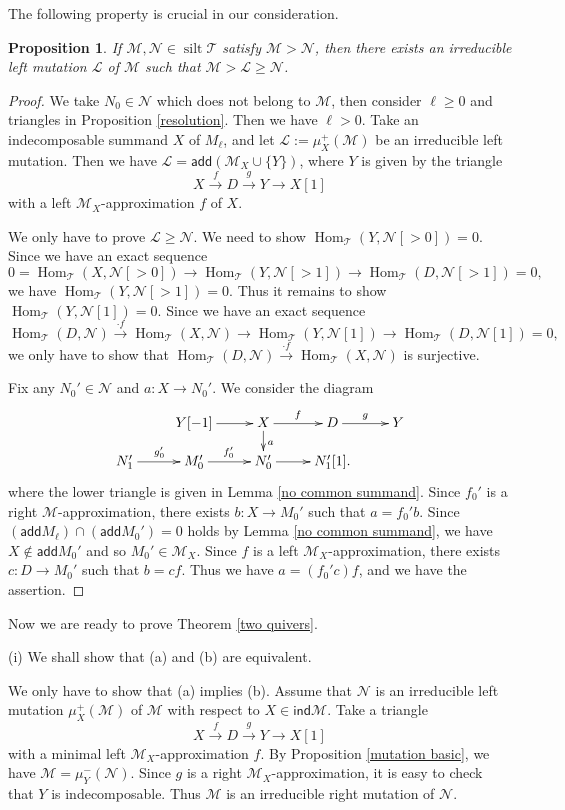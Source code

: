 \documentclass[a4paper,reqno]{amsart}
\newtheorem{proposition}[theorem]{Proposition}
\theoremstyle{definition}
\newcommand{\TT}{{\mathcal T}}
\newcommand{\MM}{{\mathcal M}}
\newcommand{\NN}{{\mathcal N}}
\newcommand{\LL}{{\mathcal L}}
\newcommand{\ind}{\mathsf{ind}}
\newcommand{\add}{\mathsf{add}}
\newcommand{\Hom}{\operatorname{Hom}\nolimits}
\newcommand{\silt}{\operatorname{silt}\nolimits}
\begin{document}
The following property is crucial in our consideration.

\begin{proposition}\label{make closer}
If $\MM,\NN\in\silt\TT$ satisfy $\MM>\NN$,
then there exists an irreducible left mutation $\LL$ of $\MM$ such that $\MM>\LL\ge\NN$.
\end{proposition}

\begin{proof}
We take $N_0\in\NN$ which does not belong to $\MM$,
then consider $\ell\ge0$ and triangles in Proposition \ref{resolution}.
Then we have $\ell>0$. Take an indecomposable summand $X$ of $M_\ell$,
and let $\LL:=\mu_X^+(\MM)$ be an irreducible left mutation.
Then we have $\LL=\add(\MM_X\cup\{Y\})$, where $Y$ is given by the triangle
\[X\xrightarrow{f}D\xrightarrow{g}Y\to X[1]\]
with a left $\MM_X$-approximation $f$ of $X$.

We only have to prove $\LL\ge\NN$. We need to show $\Hom_{\TT}(Y,\NN[>0])=0$.
Since we have an exact sequence
\[0=\Hom_{\TT}(X,\NN[>0])\to\Hom_{\TT}(Y,\NN[>1])\to\Hom_{\TT}(D,\NN[>1])=0,\]
we have $\Hom_{\TT}(Y,\NN[>1])=0$.
Thus it remains to show $\Hom_{\TT}(Y,\NN[1])=0$.
Since we have an exact sequence
\[\Hom_{\TT}(D,\NN)\xrightarrow{\cdot f}\Hom_{\TT}(X,\NN)\to\Hom_{\TT}(Y,\NN[1])\to
\Hom_{\TT}(D,\NN[1])=0,\]
we only have to show that $\Hom_{\TT}(D,\NN)\xrightarrow{\cdot f}\Hom_{\TT}(X,\NN)$ is surjective.

Fix any $N_0'\in\NN$ and $a:X\to N_0'$. 
We consider the diagram
\[\xymatrix@R=.4cm{
&Y[-1] \ar[r]& X \ar[r]^{f} \ar[d]^{a} & D\ar[r]^g&Y\\
N_1'\ar[r]^{g_0'}&M_0' \ar[r]^{f_0'} & N_0' \ar[r] &  N_1'[1].
}\]
where the lower triangle is given in Lemma \ref{no common summand}.
Since $f_0'$ is a right $\MM$-approximation, there exists $b:X\to M_0'$ such that $a=f_0'b$.
Since $(\add M_\ell)\cap(\add M_0')=0$ holds by Lemma \ref{no common summand},
we have $X\notin\add M_0'$ and so $M_0'\in\MM_X$.
Since $f$ is a left $\MM_X$-approximation, there exists $c:D\to M_0'$
such that $b=cf$. Thus we have $a=(f_0'c)f$, and we have the assertion.
\end{proof}

Now we are ready to prove Theorem \ref{two quivers}.

(i) We shall show that (a) and (b) are equivalent.

We only have to show that (a) implies (b).
Assume that $\NN$ is an irreducible left mutation $\mu_X^+(\MM)$ of $\MM$
with respect to $X\in\ind\MM$. Take a triangle
\[X\xrightarrow{f}D\xrightarrow{g}Y\to X[1]\]
with a minimal left $\MM_X$-approximation $f$. By Proposition \ref{mutation basic},
we have $\MM=\mu_Y^-(\NN)$. Since $g$ is a right $\MM_X$-approximation, it is easy to check that $Y$ is indecomposable.
Thus $\MM$ is an irreducible right mutation of $\NN$.
\end{document}

